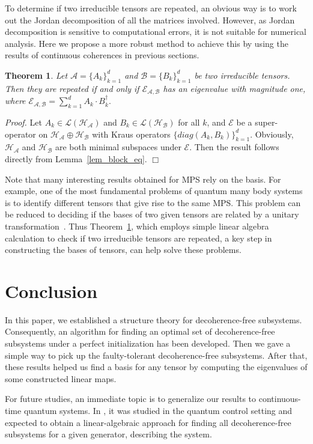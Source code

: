 \documentclass[journal]{IEEEtran}
\def\h{\ensuremath{\mathcal{H}}}
\def\l{\ensuremath{\mathcal{L}}}
\def\a{\ensuremath{\mathcal{A}}}
\def\b{\ensuremath{\mathcal{B}}}
\def\e{\ensuremath{\mathcal{E}}}
\def\l{\ensuremath{\mathcal{L}}}
\def\l{\mathcal{L}}
\newtheorem{theorem}{Theorem}
\begin{document}
To determine if two irreducible tensors are repeated, an obvious way is to work out the Jordan decomposition of all the matrices involved. However, as Jordan decomposition is sensitive to computational errors, it is not suitable for numerical analysis. Here we propose a more robust method to achieve this by using the results of continuous coherences in previous sections. 
\begin{theorem}\label{thm:repeated}
  Let $\a=\{A_{k}\}_{k=1}^{d}$ and $\b=\{B_{k}\}_{k=1}^{d}$ be two irreducible tensors. Then they are repeated if and only if $\e_{\a,\b}$ has an eigenvalue with magnitude one, where $\e_{\a,\b}=\sum_{k=1}^d A_{k}\cdot B_{k}^\dagger.$
\end{theorem}
{\it Proof.} Let $A_k\in \l(\h_\a)$ and $B_k\in \l(\h_\b)$ for all $k$, and $\e$ be a super-operator on $\h_\a\oplus \h_\b$ with Kraus operators $\{diag(A_k,B_k)\}_{k=1}^d$. Obviously, $\h_\a$ and $\h_\b$ are both minimal subspaces under $\e$. Then the result follows directly from Lemma~\ref{lem_block_eq}. 
\hfill $\Box$


Note that many interesting results obtained for MPS rely on the basis. For example, one of the most fundamental problems of quantum many body systems is to identify different tensors that give rise to the same MPS.
This problem can be reduced to deciding if the bases of two given tensors are related by a unitary transformation~\cite{cuevas2017irreducible}. 
Thus Theorem~\ref{thm:repeated}, which employs simple linear algebra calculation to check if two irreducible tensors are repeated, a key step in constructing the bases of 
tensors, can help solve these problems.

\section{Conclusion}
In this paper, we established a structure theory for decoherence-free subsystems. Consequently, an algorithm for finding an optimal set of decoherence-free subsystems under a perfect initialization has been developed. Then we gave a simple way to pick up the faulty-tolerant decoherence-free subsystems. After that, these results helped us find a basis for any tensor by computing the eigenvalues of some constructed linear maps. 

For future studies, an immediate topic is to generalize our results to continuous-time quantum systems. In \cite{ticozzi2008quantum}, it was studied in the quantum control setting and expected to obtain a linear-algebraic approach for finding all decoherence-free subsystems  for a given generator, describing the system.
\end{document}
